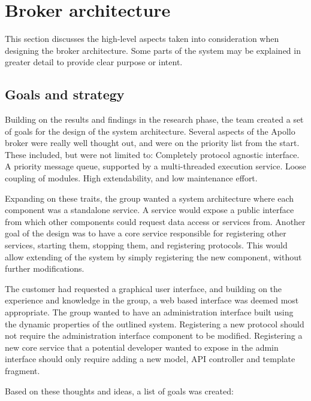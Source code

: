 \section{Broker architecture}
\label{sec:architecture_and_implementation-broker_architecture}

This section discusses the high-level aspects taken into consideration when designing the broker architecture. Some parts of the system may be explained in greater detail to provide clear purpose or intent.

\subsection{Goals and strategy}
\label{subsec:architecture_and_implementation-goals_and_strategy}

Building on the results and findings in the research phase, the team created a set of goals for the design of the system architecture. Several aspects of the Apollo broker were really well thought out, and were on the priority list from the start. These included, but were not limited to: Completely protocol agnostic interface. A priority message queue, supported by a multi-threaded execution service. Loose coupling of modules. High extendability, and low maintenance effort.

Expanding on these traits, the group wanted a system architecture where each component was a standalone service. A service would expose a public interface from which other components could request data access or services from. Another goal of the design was to have a core service responsible for registering other services, starting them, stopping them, and registering protocols. This would allow extending of the system by simply registering the new component, without further modifications.

The customer had requested a graphical user interface, and building on the experience and knowledge in the group, a web based interface was deemed most appropriate. The group wanted to have an administration interface built using the dynamic properties of the outlined system. Registering a new protocol should not require the administration interface component to be modified. Registering a new core service that a potential developer wanted to expose in the admin interface should only require adding a new model, API controller and template fragment.

Based on these thoughts and ideas, a list of goals was created:

